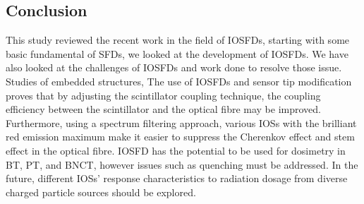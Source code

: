 \documentclass{article}
\begin{document}
\begin{multicols}{2}
\section{Conclusion}
This study reviewed the recent work in the field of IOSFDs, starting with some basic fundamental of SFDs, we looked at the development of IOSFDs. We have also looked at the challenges of IOSFDs and work done to resolve those issue.  Studies of embedded structures,  The use of IOSFDs and sensor tip modification proves that by adjusting the scintillator coupling technique, the coupling efficiency between the scintillator and the optical fibre may be improved. Furthermore, using a spectrum filtering approach, various IOSs with the brilliant red emission maximum make it easier to suppress the Cherenkov effect and stem effect in the optical fibre. IOSFD has the potential to be used for dosimetry in BT, PT, and BNCT, however issues such as quenching must be addressed. In the future, different IOSs' response characteristics to radiation dosage from diverse charged particle sources should be explored. 
\end{multicols}

\printbibliography
\end{document}
